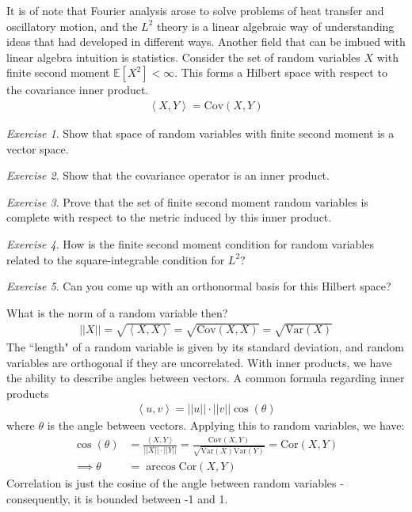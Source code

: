 \documentclass[11pt]{article}
\newcommand{\EV}{\ensuremath{\mathbb E}}
\newcommand{\Var}{\text{Var}}
\newcommand{\Cov}{\text{Cov}}
\newcommand{\ip}[2]{\left\langle #1, #2\right\rangle}
\theoremstyle{plain}
\theoremstyle{definition}
\theoremstyle{remark}
\newtheorem{exc}{Exercise}[section]
\begin{document}
It is of note that Fourier analysis arose to solve problems of heat transfer and oscillatory motion, and the $L^2$ theory is a linear algebraic way of understanding ideas that had developed in different ways. Another field that can be imbued with linear algebra intuition is statistics. Consider the set of random variables $X$ with finite second moment $\EV[X^2] < \infty$. This forms a Hilbert space with respect to the covariance inner product.
\begin{align*}
    \ip{X}{Y} = \Cov(X,Y)
\end{align*}
\begin{exc}
    Show that space of random variables with finite second moment is a vector space.
\end{exc}
\begin{exc}
    Show that the covariance operator is an inner product.
\end{exc}
\begin{exc}
    Prove that the set of finite second moment random variables is complete with respect to the metric induced by this inner product.
\end{exc}
\begin{exc}
    How is the finite second moment condition for random variables related to the square-integrable condition for $L^2$?
\end{exc}
\begin{exc}
    Can you come up with an orthonormal basis for this Hilbert space?
\end{exc}
What is the norm of a random variable then?
\begin{align*}
    ||X|| = \sqrt{\ip{X}{X}} = \sqrt{\Cov(X,X)} = \sqrt{\Var(X)}
\end{align*}
The ``length" of a random variable is given by its standard deviation, and random variables are orthogonal if they are uncorrelated. With inner products, we have the ability to describe angles between vectors. A common formula regarding inner products
\begin{align*}
    \ip{u}{v} = ||u|| \cdot ||v|| \cos(\theta)
\end{align*}
where $\theta$ is the angle between vectors. Applying this to random variables, we have:
\begin{align*}
    \cos(\theta) &= \frac{\ip{X}{Y}}{||X|| \cdot ||Y||} = \frac{\Cov(X,Y)}{\sqrt{\Var(X) \Var(Y)}} = \text{Cor}(X, Y)\\
    \implies \theta &= \arccos \text{Cor}(X, Y)
\end{align*}
Correlation is just the cosine of the angle between random variables - consequently, it is bounded between -1 and 1.
\end{document}
